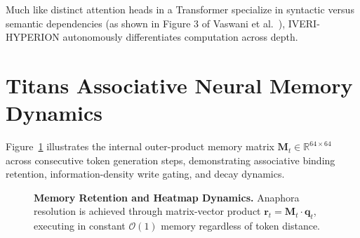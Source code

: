 \documentclass[10pt,twocolumn,letterpaper]{article}
\begin{document}
Much like distinct attention heads in a Transformer specialize in syntactic versus semantic dependencies (as shown in Figure 3 of Vaswani et al.~\cite{vaswani2017attention}), IVERI-HYPERION autonomously differentiates computation across depth.

\section{Titans Associative Neural Memory Dynamics}
\label{app:titans}

Figure~\ref{fig:titans_dynamics} illustrates the internal outer-product memory matrix $\mathbf{M}_t \in \mathbb{R}^{64 \times 64}$ across consecutive token generation steps, demonstrating associative binding retention, information-density write gating, and decay dynamics.

\begin{figure}[h]
\centering
{}
\caption{\textbf{Memory Retention and Heatmap Dynamics.} Anaphora resolution is achieved through matrix-vector product $\mathbf{r}_t = \mathbf{M}_t \cdot \mathbf{q}_t$, executing in constant $\mathcal{O}(1)$ memory regardless of token distance.}
\label{fig:titans_dynamics}
\end{figure}
\end{document}
